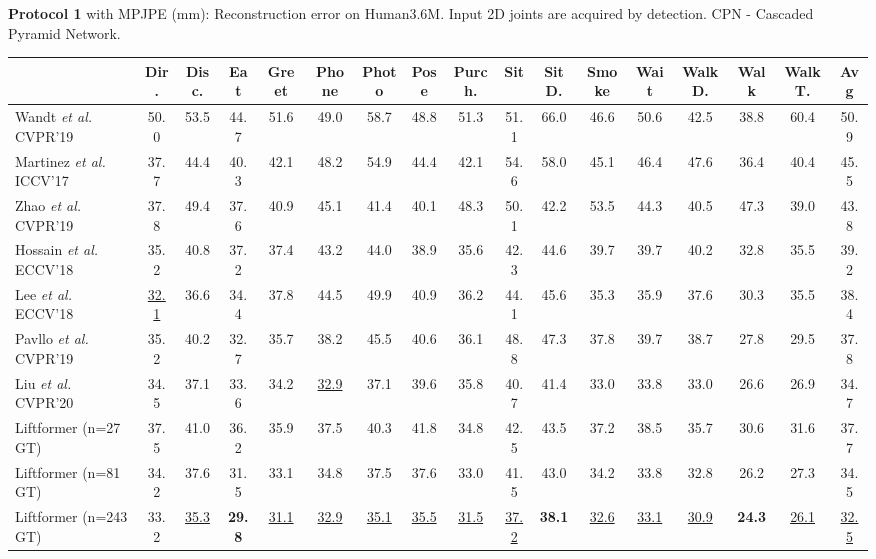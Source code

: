 \documentclass[letterpaper]{article}
\begin{document}
\begin{table*}[tp]
\caption{\textbf{Protocol 1} with MPJPE (mm): Reconstruction error on Human3.6M. Input 2D joints are acquired by detection. CPN - Cascaded Pyramid Network.}
\label{h36m:mpjpeCPN}
\end{table*}

\begin{table*}[tp]
\begin{adjustbox}{width=1\textwidth}
\begin{tabular}{l|ccccccccccccccc|c}
& Dir. & Disc. & Eat & Greet & Phone & Photo & Pose & Purch. & Sit & SitD. & Smoke & Wait & WalkD. & Walk & WalkT. & Avg \\
\hline
Wandt \textit{et al.} CVPR'19 \cite{wandt19} & 50.0 & 53.5 & 44.7 & 51.6 & 49.0 & 58.7 & 48.8 & 51.3 & 51.1 & 66.0 & 46.6 & 50.6 & 42.5 & 38.8 & 60.4 & 50.9 \\
Martinez \textit{et al.} ICCV’17 \cite{martinez17} & 37.7 & 44.4 & 40.3 & 42.1 & 48.2 & 54.9 & 44.4 & 42.1 & 54.6 & 58.0 & 45.1 & 46.4 & 47.6 & 36.4 & 40.4 & 45.5 \\
Zhao \textit{et al.} CVPR’19 \cite{zhao19} & 37.8 & 49.4 & 37.6 & 40.9 & 45.1 & 41.4 & 40.1 & 48.3 & 50.1 & 42.2 & 53.5 & 44.3 & 40.5 & 47.3 & 39.0 & 43.8 \\
Hossain \textit{et al.} ECCV’18 \cite{hossain18} & 35.2 & 40.8 & 37.2 & 37.4 & 43.2 & 44.0 & 38.9 & 35.6 & 42.3 & 44.6 & 39.7 & 39.7 & 40.2 & 32.8 & 35.5 & 39.2 \\
Lee \textit{et al.} ECCV’18 \cite{lee18} & \underline{32.1} & 36.6 & 34.4 & 37.8 & 44.5 & 49.9 & 40.9 & 36.2 & 44.1 & 45.6 & 35.3 & 35.9 & 37.6 & 30.3 & 35.5 & 38.4 \\
Pavllo \textit{et al.} CVPR’19 \cite{pavllo19} & 35.2 & 40.2 & 32.7 & 35.7 & 38.2 & 45.5 & 40.6 & 36.1 & 48.8 & 47.3 & 37.8 & 39.7 & 38.7 & 27.8 & 29.5 & 37.8 \\
Liu \textit{et al.} CVPR’20 \cite{liu20} & 34.5 & 37.1 & 33.6 & 34.2 & \underline{32.9} & 37.1 & 39.6 & 35.8 & 40.7 & 41.4 & 33.0 & 33.8 & 33.0 & 26.6 & 26.9 & 34.7 \\
\hline
Liftformer (n=27 GT) & 37.5 & 41.0 & 36.2 & 35.9 & 37.5 & 40.3 & 41.8 & 34.8 & 42.5 & 43.5 & 37.2 & 38.5 & 35.7 & 30.6 & 31.6 & 37.7 \\
Liftformer (n=81 GT)  & 34.2 & 37.6 & 31.5 & 33.1 & 34.8 & 37.5 & 37.6 & 33.0 & 41.5 & 43.0 & 34.2 & 33.8 & 32.8 & 26.2 & 27.3 & 34.5 \\
Liftformer (n=243 GT) & 33.2 & \underline{35.3} & \textbf{29.8} & \underline{31.1} & \underline{32.9} & \underline{35.1} & \underline{35.5} & \underline{31.5} & \underline{37.2} & \textbf{38.1} & \underline{32.6} & \underline{33.1} & \underline{30.9} & \textbf{24.3} & \underline{26.1} & \underline{32.5}\\

\end{tabular}
\end{adjustbox}
\end{table*}
\end{document}
